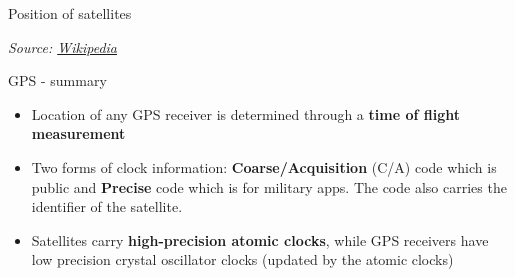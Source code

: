 \documentclass[compress]{beamer}
\newcommand{\source}[2]{\tiny\it Source: \href{#1}{#2}}
\begin{document}
\begin{frame}{Position of satellites}

    \begin{center}

    \source{https://en.wikipedia.org/wiki/File:GPS24goldenSML.gif}{Wikipedia}
    \end{center}


\end{frame}

\begin{frame}{GPS - summary}

\begin{itemize}

    \item Location of any GPS receiver is determined through a {\bf time of flight
        measurement}
\item Two forms of clock information: {\bf Coarse/Acquisition} (C/A) code which is
    public and {\bf Precise} code which is for military apps. The code also
  carries the identifier of the satellite.
\item Satellites carry {\bf high-precision atomic clocks}, while GPS receivers
  have low precision crystal oscillator clocks (updated by the atomic
  clocks)
\end{itemize}

\end{frame}
\end{document}
